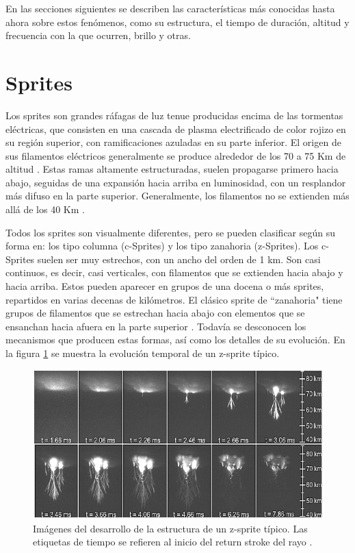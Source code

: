 \documentclass[12pt,oneside,openany,letter]{book}
\begin{document}
En las secciones siguientes se describen las características más conocidas hasta ahora sobre estos fenómenos, como su estructura, el tiempo de duración, altitud y frecuencia con la que ocurren, brillo y otras. 

\section{Sprites} 
Los sprites son grandes ráfagas de luz tenue producidas encima de las tormentas eléctricas, que consisten en una cascada de plasma electrificado de color rojizo en su región superior, con ramificaciones azuladas en su parte inferior. El origen de sus filamentos eléctricos generalmente se produce alrededor de los 70 a 75 Km de altitud \cite{FullekrugEtal2006}. Estas ramas altamente estructuradas, suelen propagarse primero hacia abajo, seguidas de una expansión hacia arriba en luminosidad, con un resplandor más difuso en la parte superior. Generalmente, los filamentos no se extienden más allá de los 40 Km \cite{FullekrugEtal2006}. 

Todos los sprites son visualmente diferentes, pero se pueden clasificar según su forma en: los tipo columna (c-Sprites) y los tipo zanahoria (z-Sprites). Los c-Sprites suelen ser muy estrechos, con un ancho del orden de 1 km. Son casi continuos, es decir, casi verticales, con filamentos que se extienden hacia abajo y hacia arriba. Estos pueden aparecer en grupos de una docena o más sprites, repartidos en varias decenas de kilómetros. El clásico sprite de ``zanahoria" tiene grupos de filamentos que se estrechan hacia abajo con elementos que se ensanchan hacia afuera en la parte superior \cite{FullekrugEtal2006}. Todavía se desconocen los mecanismos que producen estas formas, así como los detalles de su evolución. En la figura \ref{fig:sprite_evolution} se muestra la evolución temporal de un z-sprite típico.

\begin{figure}[h!]
    \centering
    \includegraphics[scale=0.8]{figures/sprite_evolution2.png}
    \caption[Evolución temporal de un sprite]{Imágenes del desarrollo de la estructura de un z-sprite típico. Las etiquetas de tiempo se refieren al inicio del return stroke del rayo \cite{CummerEtal2006}.}
    \label{fig:sprite_evolution}
\end{figure}
\end{document}
